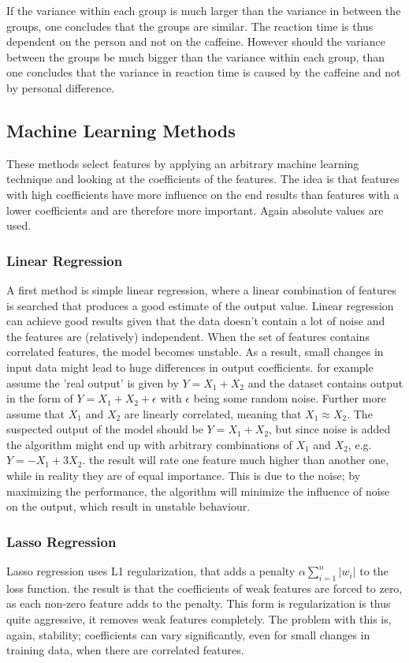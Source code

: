 \npar

If the variance within each group is much larger than the variance in between the groups, one concludes that the groups are similar. The reaction time is thus dependent on the person and not on the caffeine. However should the variance between the groups be much bigger than the variance within each group, than one concludes that the variance in reaction time is caused by the caffeine and not by personal difference.

\subsection{Machine Learning Methods}
These methods select features by applying an arbitrary machine learning technique and looking at the coefficients of the features. The idea is that features with high coefficients have more influence on the end results than features with a lower coefficients and are therefore more important. Again absolute values are used.

\subsubsection{Linear Regression}

A first method is simple linear regression, where a linear combination of features is searched that produces a good estimate of the output value. Linear regression can achieve good results given that the data doesn't contain a lot of noise and the features are (relatively) independent. When the set of features contains correlated features, the model becomes unstable. As a result, small changes in input data might lead to huge differences in output coefficients. for example assume the 'real output' is given by $Y = X_1 + X_2$ and the dataset contains output in the form of $Y = X_1 + X_2 + \epsilon$ with $\epsilon$ being some random noise. Further more assume that $X_1$ and $X_2$ are linearly correlated, meaning that $X_1 \approx X_2$. The suspected output of the model should be $Y = X_1 + X_2$, but since noise is added the algorithm might end up with arbitrary combinations of $X_1$ and $X_2$, e.g. $Y = -X_1 + 3X_2$. the result will rate one feature much higher than another one, while in reality they are of equal importance. This is due to the noise; by maximizing the performance, the algorithm will minimize the influence of noise on the output, which result in unstable behaviour.

\subsubsection{Lasso Regression}
Lasso regression uses L1 regularization, that adds a penalty $\alpha\sum\limits_{i=1}^{n} |w_i|$ to the loss function. the result is that the coefficients of weak features are forced to zero, as each non-zero feature adds to the penalty. This form is regularization is thus quite aggressive, it removes weak features completely. The problem with this is, again, stability; coefficients can vary significantly, even for small changes in training data, when there are correlated features.

